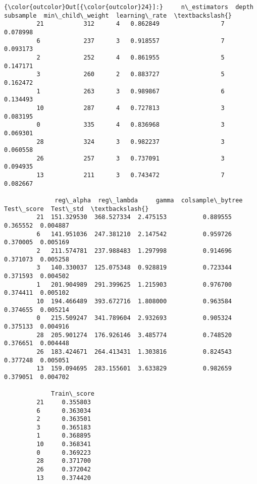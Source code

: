\documentclass[11pt]{article}
\begin{document}
\begin{Verbatim}[commandchars=\\\{\}]
{\color{outcolor}Out[{\color{outcolor}24}]:}     n\_estimators  depth  subsample  min\_child\_weight  learning\_rate  \textbackslash{}
         21           312      4   0.862849                 7       0.078998   
         6            237      3   0.918557                 7       0.093173   
         2            252      4   0.861955                 5       0.147171   
         3            260      2   0.883727                 5       0.162472   
         1            263      3   0.989867                 6       0.134493   
         10           287      4   0.727813                 3       0.083195   
         0            335      4   0.836968                 3       0.069301   
         28           324      3   0.982237                 3       0.060558   
         26           257      3   0.737091                 3       0.094935   
         13           211      3   0.743472                 7       0.082667   
         
              reg\_alpha  reg\_lambda     gamma  colsample\_bytree  Test\_score  Test\_std  \textbackslash{}
         21  151.329530  368.527334  2.475153          0.889555    0.365552  0.004887   
         6   141.951036  247.381210  2.147542          0.959726    0.370005  0.005169   
         2   211.574781  237.988483  1.297998          0.914696    0.371073  0.005258   
         3   140.330037  125.075348  0.928819          0.723344    0.371593  0.004502   
         1   201.904989  291.399625  1.215903          0.976700    0.374411  0.005102   
         10  194.466489  393.672716  1.808000          0.963584    0.374655  0.005214   
         0   215.509247  341.789604  2.932693          0.905324    0.375133  0.004916   
         28  205.901274  176.926146  3.485774          0.748520    0.376651  0.004448   
         26  183.424671  264.413431  1.303816          0.824543    0.377248  0.005051   
         13  159.094695  283.155601  3.633829          0.982659    0.379051  0.004702   
         
             Train\_score  
         21     0.355803  
         6      0.363034  
         2      0.363501  
         3      0.365183  
         1      0.368895  
         10     0.368341  
         0      0.369223  
         28     0.371700  
         26     0.372042  
         13     0.374420  
\end{Verbatim}
            
\end{document}
